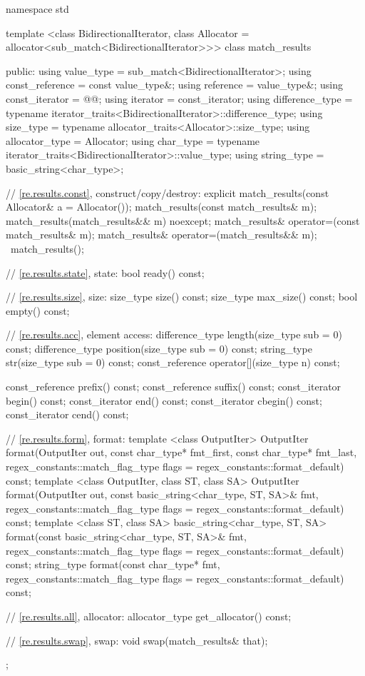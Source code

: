 \begin{codeblock}
namespace std {
  template <class BidirectionalIterator,
            class Allocator = allocator<sub_match<BidirectionalIterator>>>
  class match_results {
  public: 
     using value_type      = sub_match<BidirectionalIterator>;
     using const_reference = const value_type&;
     using reference       = value_type&;
     using const_iterator  = @{\impdef}@;
     using iterator        = const_iterator;
     using difference_type =
             typename iterator_traits<BidirectionalIterator>::difference_type;
     using size_type       = typename allocator_traits<Allocator>::size_type;
     using allocator_type  = Allocator;
     using char_type       =
             typename iterator_traits<BidirectionalIterator>::value_type;
     using string_type     = basic_string<char_type>;

     // \ref{re.results.const}, construct/copy/destroy:
     explicit match_results(const Allocator& a = Allocator());
     match_results(const match_results& m);
     match_results(match_results&& m) noexcept;
     match_results& operator=(const match_results& m); 
     match_results& operator=(match_results&& m);
     ~match_results();

     // \ref{re.results.state}, state:
     bool ready() const;

     // \ref{re.results.size}, size:
     size_type size() const;
     size_type max_size() const;
     bool empty() const;

     // \ref{re.results.acc}, element access:
     difference_type length(size_type sub = 0) const;
     difference_type position(size_type sub = 0) const;
     string_type str(size_type sub = 0) const;
     const_reference operator[](size_type n) const;

     const_reference prefix() const;
     const_reference suffix() const;
     const_iterator begin() const;
     const_iterator end() const;
     const_iterator cbegin() const;
     const_iterator cend() const;

     // \ref{re.results.form}, format:
     template <class OutputIter>
      OutputIter
      format(OutputIter out,
             const char_type* fmt_first, const char_type* fmt_last,
             regex_constants::match_flag_type flags =
              regex_constants::format_default) const;
     template <class OutputIter, class ST, class SA>
       OutputIter
       format(OutputIter out,
              const basic_string<char_type, ST, SA>& fmt,
              regex_constants::match_flag_type flags =
                regex_constants::format_default) const;
     template <class ST, class SA>
      basic_string<char_type, ST, SA>
      format(const basic_string<char_type, ST, SA>& fmt,
             regex_constants::match_flag_type flags =
               regex_constants::format_default) const;
     string_type
     format(const char_type* fmt,
            regex_constants::match_flag_type flags =
              regex_constants::format_default) const;

     // \ref{re.results.all}, allocator:
     allocator_type get_allocator() const;

     // \ref{re.results.swap}, swap:
     void swap(match_results& that);
  }; 
}
\end{codeblock}

